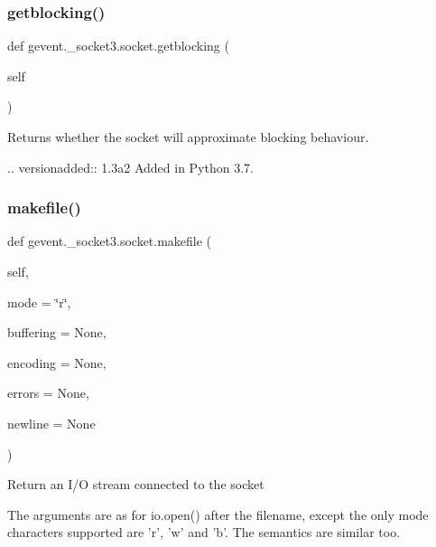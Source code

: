 \subsubsection{\texorpdfstring{getblocking()}{getblocking()}}
{\footnotesize\ttfamily def gevent.\+\_\+socket3.\+socket.\+getblocking (\begin{DoxyParamCaption}\item[{}]{self }\end{DoxyParamCaption})}

\begin{DoxyVerb}Returns whether the socket will approximate blocking
behaviour.

.. versionadded:: 1.3a2
    Added in Python 3.7.
\end{DoxyVerb}
 \mbox{\label{classgevent_1_1__socket3_1_1socket_aa5ae7dea6c94a0167197e2921f6d21d8}} 
\subsubsection{\texorpdfstring{makefile()}{makefile()}}
{\footnotesize\ttfamily def gevent.\+\_\+socket3.\+socket.\+makefile (\begin{DoxyParamCaption}\item[{}]{self,  }\item[{}]{mode = {\ttfamily \char`\"{}r\char`\"{}},  }\item[{}]{buffering = {\ttfamily None},  }\item[{}]{encoding = {\ttfamily None},  }\item[{}]{errors = {\ttfamily None},  }\item[{}]{newline = {\ttfamily None} }\end{DoxyParamCaption})}

\begin{DoxyVerb}Return an I/O stream connected to the socket

The arguments are as for io.open() after the filename,
except the only mode characters supported are 'r', 'w' and 'b'.
The semantics are similar too.
\end{DoxyVerb}
 \mbox{\label{classgevent_1_1__socket3_1_1socket_a0550453e5a9597c2e6b6fbf1d42eae4d}} 
